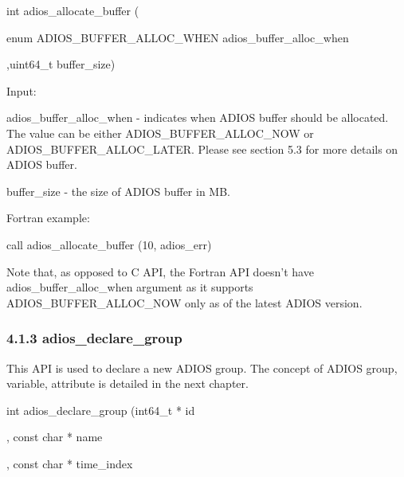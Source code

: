 \vspace{10pt}
\parindent=18pt
int adios\_allocate\_buffer (

\vspace{10pt}
\parindent=54pt
enum ADIOS\_BUFFER\_ALLOC\_WHEN adios\_buffer\_alloc\_when

\vspace{10pt}
\leftskip=22pt
\parindent=68pt
,uint64\_t buffer\_size)

\vspace{10pt}
\leftskip=22pt
\parindent=0pt
Input: 

\vspace{10pt}
\leftskip=40pt
adios\_buffer\_alloc\_when - indicates when ADIOS buffer should be allocated. The 
value can be either {\small ADIOS\_BUFFER\_ALLOC\_NOW                          
   or ADIOS\_BUFFER\_ALLOC\_LATER.  }Please see section 5.3 for more details on 
ADIOS buffer.

\vspace{10pt}
\leftskip=36pt
\parindent=4pt
buffer\_size - the size of ADIOS buffer in MB. 

\vspace{10pt}
\leftskip=22pt
\parindent=0pt
Fortran example: 

\vspace{10pt}
\leftskip=40pt
call adios\_allocate\_buffer (10, adios\_err)

\vspace{22pt}
Note that, as opposed to C API, the Fortran API doesn't have adios\_buffer\_alloc\_when 
argument as it supports {\small ADIOS\_BUFFER\_ALLOC\_NOW }only as of the latest 
ADIOS version.\label{HToc182553358}

\vspace{10pt}
\subsubsection*{{\large \textbf{4.1.3 adios\_declare\_group}}}

\vspace{10pt}
\leftskip=0pt
This API is used to declare a new ADIOS group. The concept of ADIOS group, variable, 
attribute is detailed in the next chapter.

\vspace{10pt}
int adios\_declare\_group (int64\_t * id

\vspace{10pt}
\parindent=172pt
, const char * name

\vspace{10pt}
, const char * time\_index

